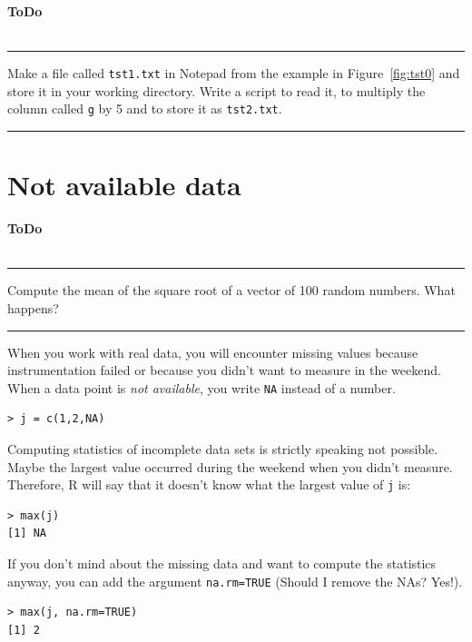 \documentclass[a4paper,11pt,twocolumn,tablecaptionabove]{scrartcl} %
\newenvironment{ToDo} {%
  \begin{flushright}
    \hfill
    \begin{minipage}{0.95\columnwidth}         %
    \textsf{\textbf{ToDo}} \\
      \vspace{-0.85cm}\\
      {\color{Gray}\rule[-0.1cm]{\columnwidth}{1.5pt}}} { %
      {\color{Gray} \rule[0.3cm]{\columnwidth}{1.5pt}}
    \end{minipage}
    \vspace{1em}
  \end{flushright}
  }
\begin{document}
\begin{ToDo}
  Make a file called \texttt{tst1.txt} in Notepad from the example in Figure~\ref{fig:tst0} and store it in your working directory. Write a
  script to read it, to multiply the column called \texttt{g} by 5 and to store it as
  \texttt{tst2.txt}.\\
\end{ToDo}


\section{Not available data}

\begin{ToDo}
Compute the mean of the square root of a vector of 100 random numbers. What happens? 
\end{ToDo}

When you work with real data, you will encounter missing values because instrumentation failed or because you didn't want to measure in the weekend. When a data point is \emph{not available}, you write \texttt{NA} instead of a number. 

\begin{Verbatim}[frame=single,gobble=0]
> j = c(1,2,NA)
\end{Verbatim}

Computing statistics of incomplete data sets is strictly speaking not possible. Maybe the largest value occurred during the weekend when you didn't measure. Therefore, R will say that it doesn't know what the largest value of \texttt{j} is: 

\begin{Verbatim}[frame=single,gobble=0]
> max(j)
[1] NA
\end{Verbatim}

If you don't mind about the missing data and want to compute the statistics anyway, you can add the argument \texttt{na.rm=TRUE} (Should I remove the NAs? Yes!). 

\begin{Verbatim}[frame=single,gobble=0]
> max(j, na.rm=TRUE)
[1] 2
\end{Verbatim}


\end{document}
